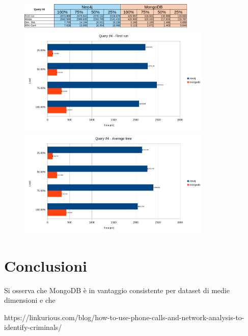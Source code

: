    \begin{figure}
        \includegraphics[width=320px, keepaspectratio, center]{query4.png}
    \label{fig:results4}
        \includegraphics[width=350px, keepaspectratio, center]{query4_fr.png}
        \label{fig:query4_fr}
        \includegraphics[width=350px, keepaspectratio, center]{query4_avg.png}
        \label{fig:query4_avg}
    \end{figure}


\section{Conclusioni}
Si osserva che MongoDB è in vantaggio consistente per dataset di medie dimensioni e che 


\begin{thebibliography}{1}
 https://linkurious.com/blog/how-to-use-phone-calls-and-network-analysis-to-identify-criminals/
\end{thebibliography}

